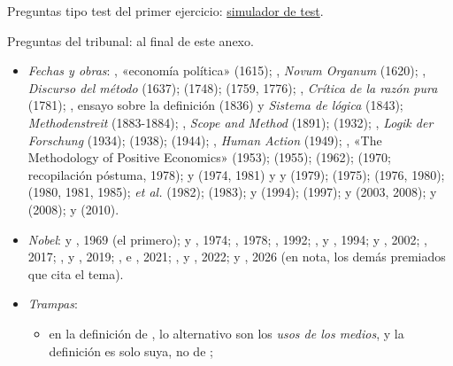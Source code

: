 \documentclass[11pt]{article}
\begin{document}
\begin{anotaciones}
Preguntas tipo test del primer ejercicio: \href{https://www.victorgutierrezmarcos.es/oposicion/temario/primer-ejercicio/test/simulador.html?tema=3.A.1}{simulador de test}.

Preguntas del tribunal: al final de este anexo.
\end{anotaciones}

\begin{itemize}
\item \emph{Fechas y obras}: , «economía política» (1615); , \emph{Novum Organum} (1620); , \emph{Discurso del método} (1637);  (1748);  (1759, 1776); , \emph{Crítica de la razón pura} (1781); , ensayo sobre la definición (1836) y \emph{Sistema de lógica} (1843); \emph{Methodenstreit} (1883-1884); , \emph{Scope and Method} (1891);  (1932); , \emph{Logik der Forschung} (1934);  (1938);  (1944); , \emph{Human Action} (1949); , «The Methodology of Positive Economics» (1953);  (1955);  (1962);  (1970; recopilación póstuma, 1978);  y  (1974, 1981) y  y  (1979);  (1975);  (1976, 1980);  (1980, 1981, 1985);  \emph{et al.} (1982);  (1983);  y  (1994);  (1997);  y  (2003, 2008);  y  (2008);  y  (2010).
\item \emph{Nobel}:  y , 1969 (el primero);  y , 1974; , 1978; , 1992; ,  y , 1994;  y , 2002; , 2017; ,  y , 2019; ,  e , 2021; ,  y , 2022;  y , 2026 (en nota, los demás premiados que cita el tema).
\item \emph{Trampas}:
  \begin{itemize}
  \item en la definición de , lo alternativo son los \emph{usos de los medios}, y la definición es solo suya, no de ;

\end{itemize}
\end{itemize}
\end{document}
